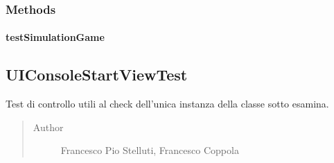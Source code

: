 \documentclass[letterpaper,10pt,italian,openany,oneside]{sphinxmanual}
\begin{document}
\subsubsection{Methods}
\label{\detokenize{test/it/unicam/cs/pa/mastermind/test/SimulationGame:methods}}

\paragraph{testSimulationGame}
\label{\detokenize{test/it/unicam/cs/pa/mastermind/test/SimulationGame:testsimulationgame}}

\begin{fulllineitems}
\label{\detokenize{test/it/unicam/cs/pa/mastermind/test/SimulationGame:it.unicam.cs.pa.mastermind.test.SimulationGame.testSimulationGame()}}
\end{fulllineitems}



\subsection{UIConsoleStartViewTest}
\label{\detokenize{test/it/unicam/cs/pa/mastermind/test/UIConsoleStartViewTest:uiconsolestartviewtest}}\label{\detokenize{test/it/unicam/cs/pa/mastermind/test/UIConsoleStartViewTest::doc}}

\begin{fulllineitems}
\label{\detokenize{test/it/unicam/cs/pa/mastermind/test/UIConsoleStartViewTest:it.unicam.cs.pa.mastermind.test.UIConsoleStartViewTest}}
Test di controllo utili al check dell’unica instanza della classe sotto esamina.
\begin{quote}\begin{description}
\item[{Author}] \leavevmode
Francesco Pio Stelluti, Francesco Coppola

\end{description}\end{quote}

\end{fulllineitems}
\end{document}
